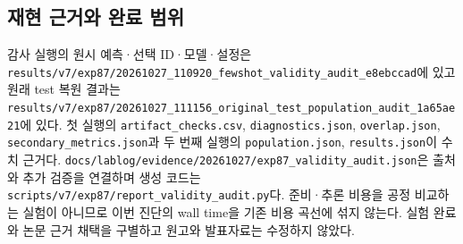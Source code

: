 \subsection{재현 근거와 완료 범위}
감사 실행의 원시 예측·선택 ID·모델·설정은 \texttt{results/\allowbreak{}\allowbreak{}v7/\allowbreak{}\allowbreak{}exp87\allowbreak{}/\allowbreak{}\allowbreak{}2026102\allowbreak{}7\_\allowbreak{}\allowbreak{}110920\allowbreak{}\_\allowbreak{}\allowbreak{}fewshot\allowbreak{}\_\allowbreak{}\allowbreak{}validit\allowbreak{}y\_\allowbreak{}\allowbreak{}audit\_\allowbreak{}\allowbreak{}e8ebccad\allowbreak{}}에 있고 원래 test 복원 결과는 \texttt{results/\allowbreak{}\allowbreak{}v7/\allowbreak{}\allowbreak{}exp87\allowbreak{}/\allowbreak{}\allowbreak{}2026102\allowbreak{}7\_\allowbreak{}\allowbreak{}111156\allowbreak{}\_\allowbreak{}\allowbreak{}origina\allowbreak{}l\_\allowbreak{}\allowbreak{}test\_\allowbreak{}\allowbreak{}p\allowbreak{}opulatio\allowbreak{}n\_\allowbreak{}\allowbreak{}audit\_\allowbreak{}\allowbreak{}1a65ae21\allowbreak{}}에 있다. 첫 실행의 \texttt{artifact\allowbreak{}\_\allowbreak{}\allowbreak{}checks.\allowbreak{}csv}, \texttt{diagnost\allowbreak{}ics.\allowbreak{}json\allowbreak{}}, \texttt{overlap.\allowbreak{}json}, \texttt{secondar\allowbreak{}y\_\allowbreak{}\allowbreak{}metric\allowbreak{}s.\allowbreak{}json}과 두 번째 실행의 \texttt{populati\allowbreak{}on.\allowbreak{}json}, \texttt{results.\allowbreak{}json}이 수치 근거다. \texttt{docs/\allowbreak{}\allowbreak{}lab\allowbreak{}log/\allowbreak{}\allowbreak{}evid\allowbreak{}ence/\allowbreak{}\allowbreak{}202\allowbreak{}61027/\allowbreak{}\allowbreak{}ex\allowbreak{}p87\_\allowbreak{}\allowbreak{}vali\allowbreak{}dity\_\allowbreak{}\allowbreak{}aud\allowbreak{}it.\allowbreak{}json}은 출처와 추가 검증을 연결하며 생성 코드는 \texttt{scripts/\allowbreak{}\allowbreak{}v7/\allowbreak{}\allowbreak{}exp87\allowbreak{}/\allowbreak{}\allowbreak{}report\_\allowbreak{}\allowbreak{}validity\allowbreak{}\_\allowbreak{}\allowbreak{}audit.\allowbreak{}p\allowbreak{}y}다. 준비·추론 비용을 공정 비교하는 실험이 아니므로 이번 진단의 wall time을 기존 비용 곡선에 섞지 않는다. 실험 완료와 논문 근거 채택을 구별하고 원고와 발표자료는 수정하지 않았다.



